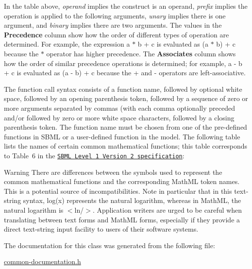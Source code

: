 In the table above, {\itshape operand} implies the construct is an operand, {\itshape prefix} implies the operation is applied to the following arguments, {\itshape unary} implies there is one argument, and {\itshape binary} implies there are two arguments. The values in the {\bfseries Precedence} column show how the order of different types of operation are determined. For example, the expression {\ttfamily a $\ast$ b + c} is evaluated as {\ttfamily (a $\ast$ b) + c} because the {\ttfamily $\ast$} operator has higher precedence. The {\bfseries Associates} column shows how the order of similar precedence operations is determined; for example, {\ttfamily a -\/ b + c} is evaluated as {\ttfamily (a -\/ b) + c} because the {\ttfamily +} and {\ttfamily -\/} operators are left-\/associative.

The function call syntax consists of a function name, followed by optional white space, followed by an opening parenthesis token, followed by a sequence of zero or more arguments separated by commas (with each comma optionally preceded and/or followed by zero or more white space characters, followed by a closing parenthesis token. The function name must be chosen from one of the pre-\/defined functions in S\+B\+ML or a user-\/defined function in the model. The following table lists the names of certain common mathematical functions; this table corresponds to Table~6 in the \href{http://sbml.org/Documents/Specifications#SBML_Level_1_Version_2}{\tt S\+B\+ML Level~1 Version~2 specification}\+:



\begin{DoxyWarning}{Warning}
There are differences between the symbols used to represent the common mathematical functions and the corresponding Math\+ML token names. This is a potential source of incompatibilities. Note in particular that in this text-\/string syntax, {\ttfamily log(x)} represents the natural logarithm, whereas in Math\+ML, the natural logarithm is {\ttfamily $<$ln/$>$}. Application writers are urged to be careful when translating between text forms and Math\+ML forms, especially if they provide a direct text-\/string input facility to users of their software systems. 
\end{DoxyWarning}


The documentation for this class was generated from the following file\+:\begin{DoxyCompactItemize}
\item 
\hyperlink{common-documentation_8h}{common-\/documentation.\+h}\end{DoxyCompactItemize}

